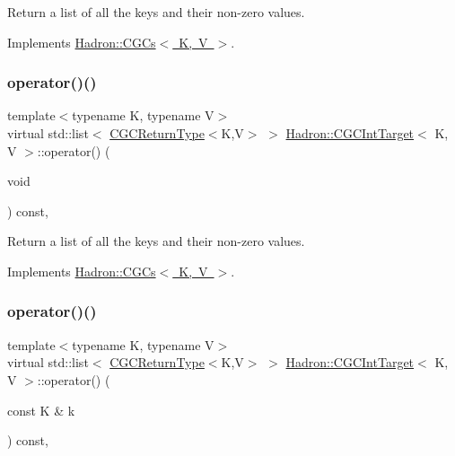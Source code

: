 Return a list of all the keys and their non-\/zero values. 



Implements \mbox{\hyperlink{classHadron_1_1CGCs_ac709374b31c0319e82028b9d7c23e993}{Hadron\+::\+C\+G\+Cs$<$ K, V $>$}}.

\mbox{\label{classHadron_1_1CGCIntTarget_ae6c0ce90fe1f8a2880984df1e2e44c18}} 
\subsubsection{\texorpdfstring{operator()()}{operator()()}\hspace{0.1cm}{\footnotesize\ttfamily [2/4]}}
{\footnotesize\ttfamily template$<$typename K, typename V$>$ \\
virtual std\+::list$<$ \mbox{\hyperlink{structHadron_1_1CGCReturnType}{C\+G\+C\+Return\+Type}}$<$K,V$>$ $>$ \mbox{\hyperlink{classHadron_1_1CGCIntTarget}{Hadron\+::\+C\+G\+C\+Int\+Target}}$<$ K, V $>$\+::operator() (\begin{DoxyParamCaption}\item[{void}]{ }\end{DoxyParamCaption}) const\hspace{0.3cm}{\ttfamily [inline]}, {\ttfamily [virtual]}}



Return a list of all the keys and their non-\/zero values. 



Implements \mbox{\hyperlink{classHadron_1_1CGCs_ac709374b31c0319e82028b9d7c23e993}{Hadron\+::\+C\+G\+Cs$<$ K, V $>$}}.

\mbox{\label{classHadron_1_1CGCIntTarget_a5946627ddb796961b97b7e0c57e32d83}} 
\subsubsection{\texorpdfstring{operator()()}{operator()()}\hspace{0.1cm}{\footnotesize\ttfamily [3/4]}}
{\footnotesize\ttfamily template$<$typename K, typename V$>$ \\
virtual std\+::list$<$ \mbox{\hyperlink{structHadron_1_1CGCReturnType}{C\+G\+C\+Return\+Type}}$<$K,V$>$ $>$ \mbox{\hyperlink{classHadron_1_1CGCIntTarget}{Hadron\+::\+C\+G\+C\+Int\+Target}}$<$ K, V $>$\+::operator() (\begin{DoxyParamCaption}\item[{const K \&}]{k }\end{DoxyParamCaption}) const\hspace{0.3cm}{\ttfamily [inline]}, {\ttfamily [virtual]}}



